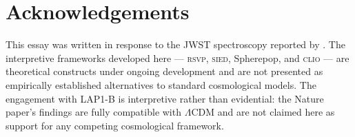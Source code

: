 \documentclass[12pt, a4paper]{article}
\newcommand{\RSVP}{\textsc{rsvp}}
\newcommand{\SIED}{\textsc{sied}}
\newcommand{\CLIO}{\textsc{clio}}
\theoremstyle{definition}
\begin{document}
\section*{Acknowledgements}

This essay was written in response to the JWST spectroscopy reported by
\citet{Nakajima2026}. The interpretive frameworks developed here ---
\RSVP{}, \SIED{}, Spherepop, and \CLIO{} --- are theoretical constructs
under ongoing development and are not presented as empirically established
alternatives to standard cosmological models. The engagement with LAP1-B
is interpretive rather than evidential: the Nature paper's findings are
fully compatible with $\Lambda$CDM and are not claimed here as support for
any competing cosmological framework.
\end{document}
